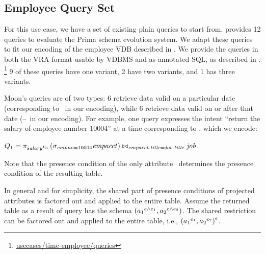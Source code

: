 \subsection{Employee Query Set}
\label{sec:emp-qs}



For this use case, we have a set of existing plain queries to start from.
\citet{prima08Moon} provides 12 queries to evaluate the Prima schema evolution
system. We adapt these queries to fit our encoding of the employee VDB
described in .
%
We provide the queries in both the VRA format usable by VDBMS and as
 annotated SQL, as described in .%
\footnote{\href{https://github.com/lambda-land/VDBMS/tree/master/usecases/time-employee/queries}{usecases/time-employee/queries}}
%
9 of these queries have one variant, 2 have two variants, and 1 has three
variants. 


Moon's queries are of two types: 6 retrieve data valid on a particular date
(corresponding to \vThree\ in our encoding), while 6 retrieve data valid on or
after that date (\vThree--\vFive\ in our encoding).
%
For example, one query expresses the intent ``return the salary of employee
number $10004$'' at a time corresponding to \vThree, which we encode:
\centerline{
\ensuremath{
Q_1 = \vPrj[\oatt{\salary}{\vThree}]{%
  \joinRelR{\selectRel{\empno=10004}{\empacct}}{\job}
           {\empacct.\titleatt = \job.\titleatt}}
}.}
 Note that the presence condition of the only attribute \salary\ determines the
 presence condition of the resulting table.

 In general and for simplicity, the shared part of presence conditions of
  projected attributes is factored out and applied to 
  the entire table. Assume the returned table as a result of
  query has the schema $\left(\oatt {\vAtt_1} {\dimMeta \wedge \dimMeta_1}, 
  \oatt {\vAtt_2} {\dimMeta \wedge \dimMeta_2} \right)$.
 The shared restriction can be factored out and applied
 to the entire table, i.e., $\left( \oatt {\vAtt_1} {\dimMeta_1},
 \oatt {\vAtt_2} {\dimMeta_2} \right)^\dimMeta$.
%

